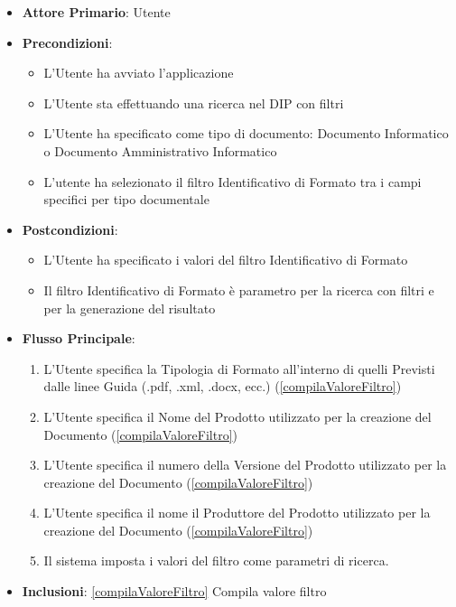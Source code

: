 \begin{itemize}
      \item \textbf{Attore Primario}: Utente
      \item \textbf{Precondizioni}: 
      \begin{itemize}
            \item L'Utente ha avviato l'applicazione
            \item L'Utente sta effettuando una ricerca nel DIP con filtri
            \item L'Utente ha specificato come tipo di documento: Documento Informatico o Documento Amministrativo Informatico
            \item L'utente ha selezionato il filtro Identificativo di Formato tra i campi specifici per tipo documentale
      \end{itemize}
      \item \textbf{Postcondizioni}: 
      \begin{itemize}
            \item L'Utente ha specificato i valori del filtro Identificativo di Formato
            \item Il filtro Identificativo di Formato è parametro per la ricerca con filtri e per la generazione del risultato
      \end{itemize}
      \item \textbf{Flusso Principale}:
            \begin{enumerate}
                  \item L'Utente specifica la Tipologia di Formato all'interno di quelli Previsti dalle
                        linee Guida (.pdf, .xml, .docx, ecc.) (\ref{compilaValoreFiltro})
                  \item L'Utente specifica il Nome del Prodotto utilizzato per la creazione del
                        Documento (\ref{compilaValoreFiltro})
                  \item L'Utente specifica il numero della Versione del Prodotto utilizzato per la
                        creazione del Documento (\ref{compilaValoreFiltro})
                  \item L'Utente specifica il nome il Produttore del Prodotto utilizzato per la
                        creazione del Documento (\ref{compilaValoreFiltro})
                  \item Il sistema imposta i valori del filtro come parametri di ricerca.
            \end{enumerate}
      \item \textbf{Inclusioni}: \ref{compilaValoreFiltro} Compila valore filtro
\end{itemize}

